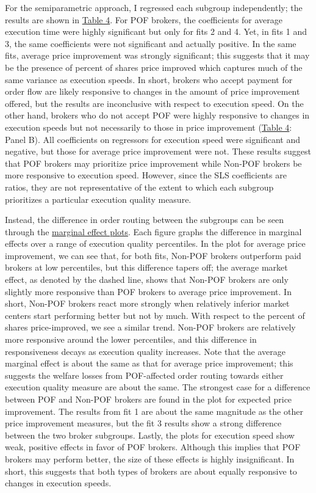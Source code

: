 \documentclass[12pt,a4paper]{extarticle}
\begin{document}
For the semiparametric approach, I regressed each subgroup independently; the results are shown in \hyperref[table:4]{Table 4}. For POF brokers, the coefficients for average execution time were highly significant but only for fits 2 and 4. Yet, in fits 1 and 3, the same  coefficients were not significant and actually positive. In the same fits, average price improvement was strongly significant; this suggests that it may be the presence of percent of shares price improved which captures much of the same variance as execution speeds. In short, brokers who accept payment for order flow are likely responsive to changes in the amount of price improvement offered, but the results are inconclusive with respect to execution speed. On the other hand, brokers who do not accept POF were highly responsive to changes in execution speeds but not necessarily to those in price improvement (\hyperref[table:4]{Table 4}: Panel B). All coefficients on regressors for execution speed were significant and negative, but those for average price improvement were not. These results suggest that POF brokers may prioritize price improvement while Non-POF brokers be more responsive to execution speed. However, since the SLS coefficients are ratios, they are not representative of the extent to which each subgroup prioritizes a particular execution quality measure.





Instead, the difference in order routing between the subgroups can be seen through the \hyperref[fig:meplots]{marginal effect plots}. Each figure graphs the difference in marginal effects over a range of execution quality percentiles. In the plot for average price improvement, we can see that, for both fits, Non-POF brokers outperform paid brokers at low percentiles, but this difference tapers off; the average market effect, as denoted by the dashed line, shows that Non-POF brokers are only slightly more responsive than POF brokers to average price improvement. In short, Non-POF brokers react more strongly when relatively inferior market centers start performing better but not by much. With respect to the percent of shares price-improved, we see a similar trend.  Non-POF brokers are relatively more responsive around the lower percentiles, and this difference in responsiveness decays as execution quality increases. Note that the average marginal effect is about the same as that for average price improvement; this suggests the welfare losses from POF-affected order routing towards either execution quality measure are about the same. The strongest case for a difference between POF and Non-POF brokers are found in the plot for expected price improvement. The results from fit 1 are about the same magnitude as the other price improvement measures, but the fit 3 results show a strong difference between the two broker subgroups. Lastly, the plots for execution speed show weak, positive effects in favor of POF brokers. Although this implies that POF brokers may perform better, the size of these effects is highly insignificant. In short, this suggests that both types of brokers are about equally responsive to changes in execution speeds.
\end{document}

